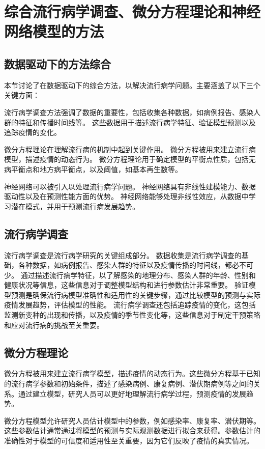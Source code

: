 \chapter{综合流行病学调查、微分方程理论和神经网络模型的方法} \label{ch:methods}


\section{数据驱动下的方法综合}

本节讨论了在数据驱动下的综合方法，以解决流行病学问题。主要涵盖了以下三个关键方面：

流行病学调查方法强调了数据的重要性，包括收集各种数据，如病例报告、感染人群的特征和传播时间线等。
这些数据用于描述流行病学特征、验证模型预测以及追踪疫情的变化。

微分方程理论在理解流行病的机制中起到关键作用。
微分方程被用来建立流行病模型，描述疫情的动态行为。
微分方程理论用于确定模型的平衡点性质，包括无病平衡点和地方病平衡点，以及阈值，如基本再生数等。

神经网络可以被引入以处理流行病学问题。
神经网络具有非线性建模能力、数据驱动性以及在预测性能方面的优势。
神经网络能够处理非线性效应，从数据中学习潜在模式，并用于预测流行病发展趋势。


\section{流行病学调查}

流行病学调查是流行病学研究的关键组成部分。
数据收集是流行病学调查的基础，各种数据，如病例报告、感染人群的特征以及疫情传播的时间线，都必不可少。
通过描述流行病学特征，以了解感染的地理分布、感染人群的年龄、性别和健康状况等信息，这些信息对于调整模型结构和进行参数估计非常重要。
验证模型预测是确保流行病模型准确性和适用性的关键步骤，通过比较模型的预测与实际疫情发展趋势，评估模型的性能。
流行病学调查还包括追踪疫情的变化，这包括监测新变种的出现和传播，以及疫情的季节性变化等，这些信息对于制定干预策略和应对流行病的挑战至关重要。


\section{微分方程理论}

微分方程被用来建立流行病学模型，描述疫情的动态行为。这些微分方程基于已知的流行病学参数和初始条件，描述了感染病例、康复病例、潜伏期病例等之间的关系。通过建立模型，研究人员可以更好地理解流行病学过程，预测疫情的发展趋势。

微分方程模型允许研究人员估计模型中的参数，例如感染率、康复率、潜伏期等。这些参数估计通常通过将模型的预测与实际观测数据进行拟合来获得。参数估计的准确性对于模型的可信度和适用性至关重要，因为它们反映了疫情的真实情况。

